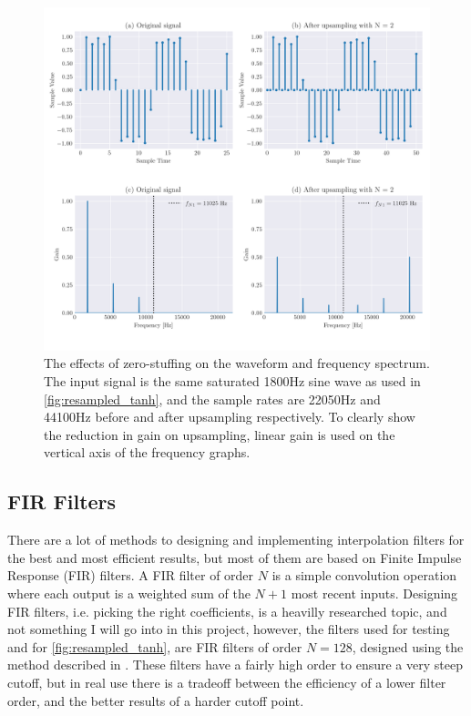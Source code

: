 \begin{figure}
  \centering
  \includegraphics[width=\textwidth]{Pictures/interpolation.png}
  \caption{The effects of zero-stuffing on the waveform and frequency spectrum. The input signal is the same saturated
    1800Hz sine wave as used in \autoref{fig:resampled_tanh}, and the sample rates are 22050Hz and 44100Hz before and  after upsampling respectively. To clearly show the
    reduction in gain on upsampling, linear gain is used on the vertical axis of the frequency graphs.}
  \label{fig:interpolation}
\end{figure}

\subsection{FIR Filters}

There are a lot of methods to designing and implementing interpolation filters for the best and most
efficient results, but most of them are based on Finite Impulse Response (FIR) filters. A FIR filter of order
$N$ is a simple convolution operation where each output is a weighted sum of the
$N + 1$ most recent inputs. Designing FIR filters, i.e. picking the right coefficients, is a
heavilly researched topic\autocite{kahles2019oversampling, SORIA2013, thomas2009}, and not something I will go into in this project, however,
the filters used for testing and for \autoref{fig:resampled_tanh}, are FIR filters of order $N = 128$,
designed using the method described in \autocite{fiir}. These filters have a fairly high order to
ensure a very steep cutoff, but in real use there is a tradeoff between the efficiency of a lower filter
order, and the better results of a harder cutoff point.

